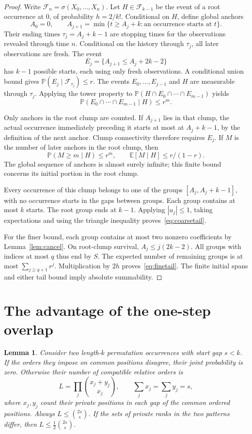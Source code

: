 \documentclass[11pt]{amsart}
\newtheorem{lemma}[theorem]{Lemma}
\theoremstyle{remark}
\newcommand{\Prb}{\mathbb P}
\newcommand{\E}{\mathbb E}
\begin{document}
\begin{proof}
Write $\mathcal F_n=\sigma(X_0,\ldots,X_n)$. Let $H\in\mathcal F_{k-1}$ be the event of a root occurrence at $0$, of probability $h=2/k!$. Conditional on $H$, define global anchors
\[
 A_0=0,\qquad A_{j+1}=\min\{t\ge A_j+k:\text{an occurrence starts at }t\}.
\]
Their ending times $\tau_j=A_j+k-1$ are stopping times for the observations revealed through time $n$. Conditional on the history through $\tau_j$, all later observations are fresh. The event
\[
 E_j=\{A_{j+1}\le A_j+2k-2\}
\]
has $k-1$ possible starts, each using only fresh observations. A conditional union bound gives $\Prb(E_j\mid\mathcal F_{\tau_j})\le r$. The events $E_0,\ldots,E_{j-1}$ and $H$ are measurable through $\tau_j$. Applying the tower property to $\Prb(H\cap E_0\cap\cdots\cap E_{m-1})$ yields
\[
 \Prb(E_0\cap\cdots\cap E_{m-1}\mid H)\le r^m.
\]

Only anchors in the root clump are counted. If $A_{j+1}$ lies in that clump, the actual occurrence immediately preceding it starts at most at $A_j+k-1$, by the definition of the next anchor. Clump connectivity therefore requires $E_j$. If $M$ is the number of later anchors in the root clump, then
\[
 \Prb(M\ge m\mid H)\le r^m,\qquad \E[M\mid H]\le r/(1-r).
\]
The global sequence of anchors is almost surely infinite; this finite bound concerns its initial portion in the root clump.

Every occurrence of this clump belongs to one of the groups $[A_j,A_j+k-1]$, with no occurrence starts in the gaps between groups. Each group contains at most $k$ starts. The root group ends at $k-1$. Applying $|u_j|\le1$, taking expectations and using the triangle inequality proves~\eqref{eq:coarsetail}.

For the finer bound, each group contains at most two nonzero coefficients by Lemma~\ref{lem:cancel}. On root-clump survival, $A_j\le j(2k-2)$. All groups with indices at most $q$ thus end by $S$. The expected number of remaining groups is at most $\sum_{j\ge q+1}r^j$. Multiplication by $2h$ proves~\eqref{eq:finetail}. The finite initial spans and either tail bound imply absolute summability.
\end{proof}

\section{The advantage of the one-step overlap}

\begin{lemma}\label{lem:half}
Consider two length-$k$ permutation occurrences with start gap $s<k$. If the orders they impose on common positions disagree, their joint probability is zero. Otherwise their number of compatible relative orders is
\begin{equation}\label{eq:extensions}
 L=\prod_j\binom{x_j+y_j}{x_j},\qquad \sum_jx_j=\sum_jy_j=s,
\end{equation}
where $x_j,y_j$ count their private positions in each gap of the common ordered positions. Always $L\le\binom{2s}{s}$. If the sets of private ranks in the two patterns differ, then $L\le\frac12\binom{2s}{s}$.
\end{lemma}
\end{document}
